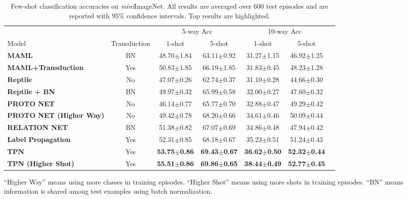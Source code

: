 \documentclass{article} \usepackage{iclr2019_conference,times}
\def\mini{{\textit{mini}ImageNet}}
\begin{document}
\begin{table}[h]
\centering
\begin{threeparttable}
\small
\caption{Few-shot classification accuracies on \mini. All results are averaged over 600 test episodes and are reported with 95\% confidence intervals. Top results are highlighted.}
\label{mini-results-std}
\begin{tabular}{lcccccc} \hline
                                       					&              & \multicolumn{2}{c}{5-way Acc} & \multicolumn{2}{c}{10-way Acc}                           \\
Model                                  					& Transduction & \multicolumn{1}{c}{1-shot} & \multicolumn{1}{c}{5-shot} & \multicolumn{1}{c}{1-shot} & \multicolumn{1}{c}{5-shot}\\ \hline
\textbf{MAML}             		& BN & 48.70$\pm$1.84 & 63.11$\pm$0.92 & 31.27$\pm$1.15 & 46.92$\pm$1.25    \\
\textbf{MAML+Transduction}      & Yes& 50.83$\pm$1.85 & 66.19$\pm$1.85 & 31.83$\pm$0.45 & 48.23$\pm$1.28    \\
\textbf{Reptile}                & No & 47.07$\pm$0.26 & 62.74$\pm$0.37 & 31.10$\pm$0.28 & 44.66$\pm$0.30    \\
\textbf{Reptile + BN} 	        & BN & 49.97$\pm$0.32 & 65.99$\pm$0.58 & 32.00$\pm$0.27 & 47.60$\pm$0.32    \\
\textbf{PROTO NET}              & No & 46.14$\pm$0.77 & 65.77$\pm$0.70 & 32.88$\pm$0.47 & 49.29$\pm$0.42    \\
\textbf{PROTO NET (Higher Way)}	& No & 49.42$\pm$0.78 & 68.20$\pm$0.66 & 34.61$\pm$0.46 & 50.09$\pm$0.44    \\
\textbf{RELATION NET}           & BN & 51.38$\pm$0.82 & 67.07$\pm$0.69 & 34.86$\pm$0.48 & 47.94$\pm$0.42    \\ \hline
\textbf{Label Propagation}      & Yes& 52.31$\pm$0.85 & 68.18$\pm$0.67 & 35.23$\pm$0.51 & 51.24$\pm$0.43\\
\textbf{TPN}                    & Yes& \textbf{53.75$\pm$0.86} & \textbf{69.43$\pm$0.67} & \textbf{36.62$\pm$0.50} & \textbf{52.32$\pm$0.44}    \\
\textbf{TPN (Higher Shot)}      & Yes & \textbf{55.51$\pm$0.86} & \textbf{69.86$\pm$0.65} & \textbf{38.44$\pm$0.49} & \textbf{52.77$\pm$0.45}    \\ \hline
\end{tabular}
\begin{tablenotes}
  	\item * ``Higher Way'' means using more classes in training episodes. ``Higher Shot'' means using more shots in training episodes. ``BN'' means information is shared among test examples using batch normalization.
\end{tablenotes} 
\end{threeparttable}
\end{table}
\end{document}
